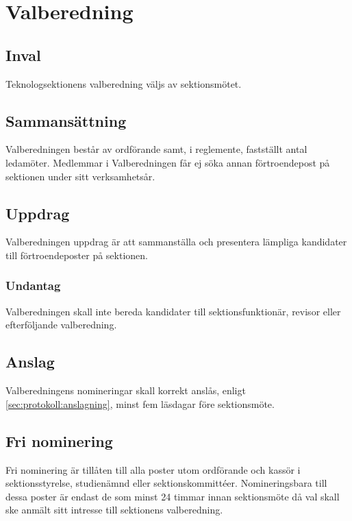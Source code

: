 \section{Valberedning}

\subsection{Inval}
Teknologsektionens valberedning väljs av sektionsmötet.

\subsection{Sammansättning}
Valberedningen består av ordförande samt, i reglemente, fastställt antal ledamöter. Medlemmar i Valberedningen får ej söka annan förtroendepost på sektionen under sitt verksamhetsår.

\subsection{Uppdrag}
Valberedningen uppdrag är att sammanställa och presentera lämpliga kandidater till förtroendeposter på sektionen.

\subsubsection{Undantag}
Valberedningen skall inte bereda kandidater till sektionsfunktionär, revisor eller efterföljande valberedning.

\subsection{Anslag}
Valberedningens nomineringar skall korrekt anslås, enligt \ref{sec:protokoll:anslagning}, minst fem läsdagar före sektionsmöte.

\subsection{Fri nominering}
Fri nominering är tillåten till alla poster utom ordförande och kassör i sektionsstyrelse, studienämnd eller sektionskommittéer. Nomineringsbara till dessa poster är endast de som minst 24 timmar innan sektionsmöte då val skall ske anmält sitt intresse till sektionens valberedning.
